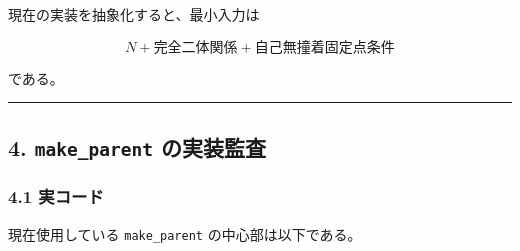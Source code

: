 \documentclass[
  a4paper,
]{ltjsarticle}
\begin{document}
現在の実装を抽象化すると、最小入力は

\[
\boxed{
N
+\text{完全二体関係}
+\text{自己無撞着固定点条件}
}
\]

である。

\begin{center}\rule{0.5\linewidth}{0.5pt}\end{center}

\subsection{\texorpdfstring{4. \texttt{make\_parent}
の実装監査}{4. make\_parent の実装監査}}\label{make_parent-ux306eux5b9fux88c5ux76e3ux67fb}

\subsubsection{4.1 実コード}\label{ux5b9fux30b3ux30fcux30c9}

現在使用している \texttt{make\_parent} の中心部は以下である。
\end{document}
